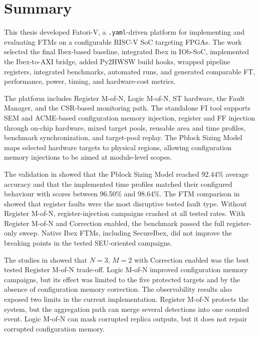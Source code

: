 \label{chap10:conclusion}

\section{Summary}
\label{sec:conclusion_assessment}

This thesis developed \ac{Fatori-V}, a \texttt{.yaml}-driven platform for implementing and evaluating \acp{FTM} on a configurable \ac{RISC-V} \ac{SoC} targeting \acp{FPGA}. The work selected the final Ibex-based baseline, integrated Ibex in IOb-\ac{SoC}, implemented the Ibex-to-\ac{AXI} bridge, added Py2HWSW build hooks, wrapped pipeline registers, integrated benchmarks, automated runs, and generated comparable \ac{FT}, performance, power, timing, and hardware-cost metrics.

The platform includes Register M-of-N, Logic M-of-N, \ac{ST} hardware, the Fault Manager, and the \ac{CSR}-based monitoring path. The standalone \ac{FI} tool supports \ac{SEM} and \ac{ACME}-based configuration memory injection, register and \ac{FF} injection through on-chip hardware, mixed target pools, reusable area and time profiles, benchmark synchronization, and target-pool replay. The Pblock Sizing Model maps selected hardware targets to physical regions, allowing configuration memory injections to be aimed at module-level scopes.

The validation in  showed that the Pblock Sizing Model reached 92.44\% average accuracy and that the implemented time profiles matched their configured behaviour with scores between 96.50\% and 98.64\%. The \ac{FTM} comparison in  showed that register faults were the most disruptive tested fault type. Without Register M-of-N, register-injection campaigns crashed at all tested rates. With Register M-of-N and Correction enabled, the benchmark passed the full register-only sweep. Native Ibex \acp{FTM}, including SecureIbex, did not improve the breaking points in the tested \ac{SEU}-oriented campaigns.

The studies in  showed that $N=3$, $M=2$ with Correction enabled was the best tested Register M-of-N trade-off. Logic M-of-N improved configuration memory campaigns, but its effect was limited to the five protected targets and by the absence of configuration memory correction. The observability results also exposed two limits in the current implementation. Register M-of-N protects the system, but the aggregation path can merge several detections into one counted event. Logic M-of-N can mask corrupted replica outputs, but it does not repair corrupted configuration memory.

